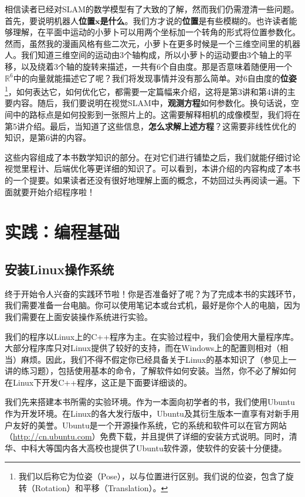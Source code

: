 \clearpage
相信读者已经对SLAM的数学模型有了大致的了解，然而我们仍需澄清一些问题。首先，要说明机器人\textbf{位置$\bm{x}$是什么}。我们方才说的\textbf{位置}是有些模糊的。也许读者能够理解，在平面中运动的小萝卜可以用两个坐标加一个转角的形式将位置参数化。然而，虽然我的漫画风格有些二次元，小萝卜在更多时候是一个三维空间里的机器人。我们知道三维空间的运动由3个轴构成，所以小萝卜的运动要由3个轴上的平移，以及绕着3个轴的旋转来描述，一共有6个自由度。那是否意味着随便用一个$\mathbb{R}^6$中的向量就能描述它了呢？我们将发现事情并没有那么简单。对6自由度的\textbf{位姿}\footnote{我们以后称它为位姿（Pose），以与位置进行区别。我们说的位姿，包含了旋转（Rotation）和平移（Translation）。}，如何表达它，如何优化它，都需要一定篇幅来介绍，这将是第3讲和第4讲的主要内容。随后，我们要说明在视觉SLAM中，\textbf{观测方程}如何参数化。换句话说，空间中的路标点是如何投影到一张照片上的。这需要解释相机的成像模型，我们将在第5讲介绍。最后，当知道了这些信息，\textbf{怎么求解上述方程}？这需要非线性优化的知识，是第6讲的内容。

这些内容组成了本书数学知识的部分。在对它们进行铺垫之后，我们就能仔细讨论视觉里程计、后端优化等更详细的知识了。可以看到，本讲介绍的内容构成了本书的一个提要。如果读者还没有很好地理解上面的概念，不妨回过头再阅读一遍。下面就要开始介绍程序啦！

\section{实践：编程基础}
\subsection{安装Linux操作系统}
终于开始令人兴奋的实践环节啦！你是否准备好了呢？为了完成本书的实践环节，我们需要准备一台电脑。你可以使用笔记本或台式机，最好是你个人的电脑，因为我们需要在上面安装操作系统进行实验。

我们的程序以Linux上的C++程序为主。在实验过程中，我们会使用大量程序库。大部分程序库只对Linux提供了较好的支持，而在Windows上的配置则相对（相当）麻烦。因此，我们不得不假定你已经具备关于Linux的基本知识了（参见上一讲的练习题），包括使用基本的命令，了解软件如何安装。当然，你不必了解如何在Linux下开发C++程序，这正是下面要详细谈的。

我们先来搭建本书所需的实验环境。作为一本面向初学者的书，我们使用Ubuntu作为开发环境。在Linux的各大发行版中，Ubuntu及其衍生版本一直享有对新手用户友好的美誉。Ubuntu是一个开源操作系统，它的系统和软件可以在官方网站（\url{http://cn.ubuntu.com}）免费下载，并且提供了详细的安装方式说明。同时，清华、中科大等国内各大高校也提供了Ubuntu软件源，使软件的安装十分便捷。

